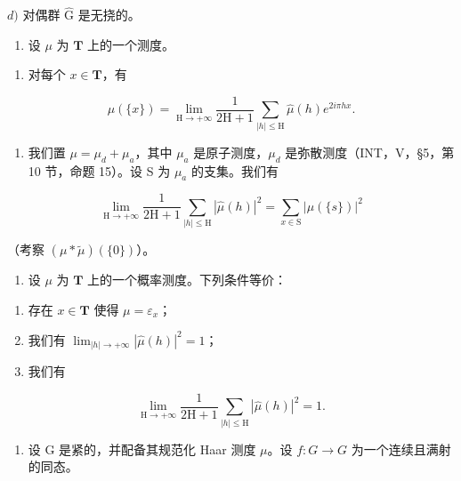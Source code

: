 \(d)\) 对偶群 \(\widehat{\mathrm{G}}\) 是无挠的。

\begin{enumerate}
\def\labelenumi{\arabic{enumi})}
\setcounter{enumi}{63}
\tightlist
\item
  设 \(\mu\) 为 \(\mathbf{T}\) 上的一个测度。
\end{enumerate}

\begin{enumerate}
\def\labelenumi{\alph{enumi})}
\tightlist
\item
  对每个 \(x \in \mathbf{T}\)，有
\end{enumerate}

\[
\mu (\{x \}) = \lim _ {\mathrm{H} \rightarrow + \infty} \frac {1}{2 \mathrm{H} + 1} \sum_ {| h | \leqslant \mathrm{H}} \widehat {\mu} (h) e ^ {2 i \pi h x}.
\]

\begin{enumerate}
\def\labelenumi{\alph{enumi})}
\setcounter{enumi}{1}
\tightlist
\item
  我们置 \(\mu = \mu_d + \mu_a\)，其中 \(\mu_a\) 是原子测度，\(\mu_d\) 是弥散测度（INT，V，§5，第 10 节，命题 15）。设 S 为 \(\mu_a\) 的支集。我们有
\end{enumerate}

\[
\lim _ {\mathrm{H} \to + \infty} \frac {1}{2 \mathrm{H} + 1} \sum_ {| h | \leqslant \mathrm{H}} | \widehat {\mu} (h) | ^ {2} = \sum_ {x \in \mathrm{S}} | \mu (\{s \}) | ^ {2}
\]

（考察 \((\mu * \widetilde{\mu})(\{0\})\)）。

\begin{enumerate}
\def\labelenumi{\alph{enumi})}
\setcounter{enumi}{2}
\tightlist
\item
  设 \(\mu\) 为 \(\mathbf{T}\) 上的一个概率测度。下列条件等价：
\end{enumerate}

\begin{enumerate}
\def\labelenumi{(\roman{enumi})}
\item
  存在 \(x \in \mathbf{T}\) 使得 \(\mu = \varepsilon_x\)；
\item
  我们有 \(\lim_{|h|\to+\infty}|\widehat{\mu}(h)|^{2}=1\)；
\item
  我们有
\end{enumerate}

\[
\lim _ {\mathrm{H} \rightarrow + \infty} \frac {1}{2 \mathrm{H} + 1} \sum_ {| h | \leqslant \mathrm{H}} | \widehat {\mu} (h) | ^ {2} = 1.
\]

\begin{enumerate}
\def\labelenumi{\arabic{enumi})}
\setcounter{enumi}{64}
\tightlist
\item
  设 G 是紧的，并配备其规范化 Haar 测度 \(\mu\)。设 \(f: G \to G\) 为一个连续且满射的同态。
\end{enumerate}

